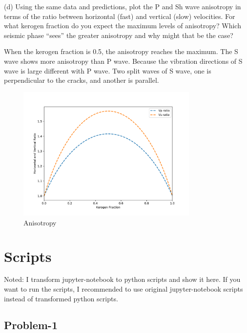 \begin{problem}{(d)}
    Using the same data and predictions, plot the P and Sh wave anisotropy in terms of the ratio between horizontal (fast) and vertical (slow) velocities. For what kerogen fraction do you expect the maximum levels of anisotropy? Which seismic phase “sees” the greater anisotropy and why might that be the case?
\end{problem}
\begin{solution}
    When the kerogen fraction is 0.5, the anisotropy reaches the maximum.
    The S wave shows more anisotropy than P wave.
    Because the vibration directions of S wave is large different with P wave.
    Two split waves of S wave, one is perpendicular to the cracks, and another is parallel.
    \begin{figure}[H]
        \centering
        \includegraphics[width=0.8\textwidth]{figures/homework-2/p3-d.pdf}
        \caption{Anisotropy}
        \label{fig:p3-d}
    \end{figure}
\end{solution}


\section{Scripts}
Noted: I transform jupyter-notebook to python scripts and show it here. 
If you want to run the scripts, I recommended to use original jupyter-notebook scripts instead of transformed python scripts. 

\subsection{Problem-1}


